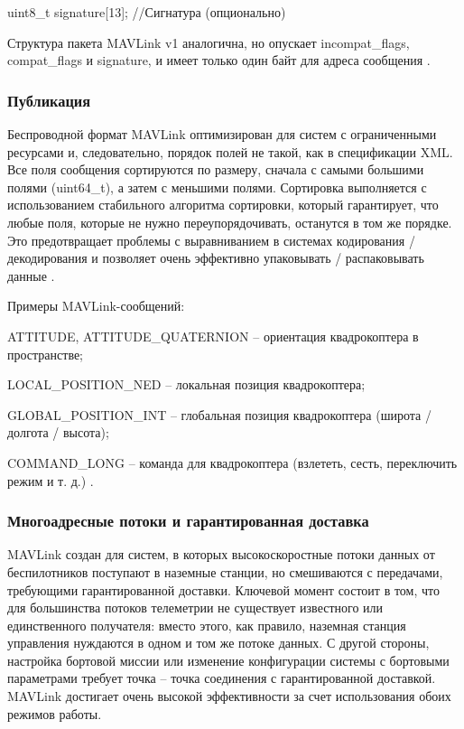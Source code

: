 uint8\_t signature[13];      //Сигнатура (опционально)

Структура пакета MAVLink v1 аналогична, но опускает incompat\_flags, compat\_flags и signature, и имеет только один байт для адреса сообщения \cite{mavlink}.

\subsubsection{Публикация}
Беспроводной формат MAVLink оптимизирован для систем с ограниченными ресурсами и, следовательно, порядок полей не такой, как в спецификации XML. Все поля сообщения сортируются по размеру, сначала с самыми большими полями (uint64\_t), а затем с меньшими полями. Сортировка выполняется с использованием стабильного алгоритма сортировки, который гарантирует, что любые поля, которые не нужно переупорядочивать, останутся в том же порядке. Это предотвращает проблемы с выравниванием в системах кодирования / декодирования и позволяет очень эффективно упаковывать / распаковывать данные \cite{mavlink}.

Примеры MAV\-Link-сообщений:

ATTITUDE, ATTITUDE\_QUATERNION – ориентация квадрокоптера в пространстве;

LOCAL\_POSITION\_NED – локальная позиция квадрокоптера;

GLOBAL\_POSITION\_INT – глобальная позиция квадрокоптера (широта / долгота / высота);

COMMAND\_LONG – команда для квадрокоптера (взлететь, сесть, переключить режим и т. д.) \cite{clover}.

\subsubsection{Многоадресные потоки и гарантированная доставка}
MAVLink создан для систем, в которых высокоскоростные потоки данных от беспилотников поступают в наземные станции, но смешиваются с передачами, требующими гарантированной доставки. Ключевой момент состоит в том, что для большинства потоков телеметрии не существует известного или единственного получателя: вместо этого, как правило, наземная станция управления нуждаются в одном и том же потоке данных.
С другой стороны, настройка бортовой миссии или изменение конфигурации системы с бортовыми параметрами требует точка -- точка соединения с гарантированной доставкой. MAVLink достигает очень высокой эффективности за счет использования обоих режимов работы.

